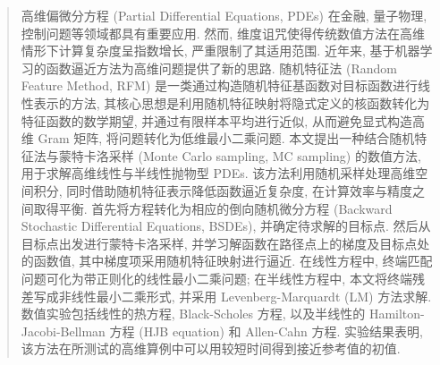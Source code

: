 

\begin{abstract}
  高维偏微分方程 (Partial Differential Equations, PDEs) 在金融, 量子物理, 控制问题等领域都具有重要应用.
  然而, 维度诅咒使得传统数值方法在高维情形下计算复杂度呈指数增长, 严重限制了其适用范围.
  近年来, 基于机器学习的函数逼近方法为高维问题提供了新的思路.
  随机特征法 (Random Feature Method, RFM) 是一类通过构造随机特征基函数对目标函数进行线性表示的方法,
  其核心思想是利用随机特征映射将隐式定义的核函数转化为特征函数的数学期望, 并通过有限样本平均进行近似,
  从而避免显式构造高维 Gram 矩阵, 将问题转化为低维最小二乘问题.
  本文提出一种结合随机特征法与蒙特卡洛采样 (Monte Carlo sampling, MC sampling) 的数值方法,
  用于求解高维线性与半线性抛物型 PDEs.
  该方法利用随机采样处理高维空间积分, 同时借助随机特征表示降低函数逼近复杂度, 在计算效率与精度之间取得平衡.
  首先将方程转化为相应的倒向随机微分方程 (Backward Stochastic Differential Equations, BSDEs), 并确定待求解的目标点.
  然后从目标点出发进行蒙特卡洛采样, 并学习解函数在路径点上的梯度及目标点处的函数值, 其中梯度项采用随机特征映射进行逼近.
  在线性方程中, 终端匹配问题可化为带正则化的线性最小二乘问题;
  在半线性方程中, 本文将终端残差写成非线性最小二乘形式, 并采用 Levenberg-Marquardt (LM) 方法求解.
  数值实验包括线性的热方程, Black-Scholes 方程,
  以及半线性的 Hamilton-Jacobi-Bellman 方程 (HJB equation) 和 Allen-Cahn 方程.
  实验结果表明, 该方法在所测试的高维算例中可以用较短时间得到接近参考值的初值.
\end{abstract}

